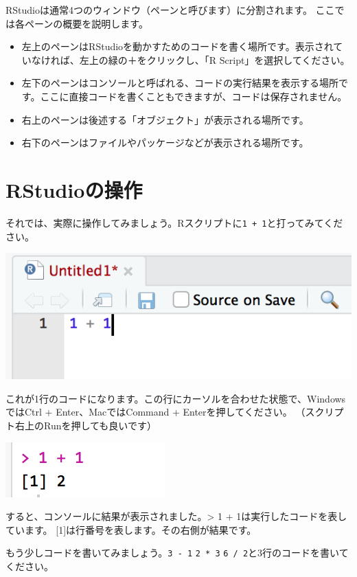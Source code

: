 \documentclass[
]{book}
\providecommand{\tightlist}{%
  \setlength{\itemsep}{0pt}\setlength{\parskip}{0pt}}
\begin{document}
RStudioは通常4つのウィンドウ（ペーンと呼びます）に分割されます。
ここでは各ペーンの概要を説明します。

\begin{itemize}
\tightlist
\item
  左上のペーンはRStudioを動かすためのコードを書く場所です。表示されていなければ、左上の緑の＋をクリックし、「R Script」を選択してください。
\item
  左下のペーンはコンソールと呼ばれる、コードの実行結果を表示する場所です。ここに直接コードを書くこともできますが、コードは保存されません。
\item
  右上のペーンは後述する「オブジェクト」が表示される場所です。
\item
  右下のペーンはファイルやパッケージなどが表示される場所です。
\end{itemize}

\hypertarget{rstudioux306eux64cdux4f5c}{%
\section{RStudioの操作}\label{rstudioux306eux64cdux4f5c}}

それでは、実際に操作してみましょう。Rスクリプトに\texttt{1\ +\ 1}と打ってみてください。

\begin{center}\includegraphics[width=0.4\linewidth]{image/basic1} \end{center}

これが1行のコードになります。この行にカーソルを合わせた状態で、WindowsではCtrl + Enter、MacではCommand + Enterを押してください。
（スクリプト右上のRunを押しても良いです）

\begin{center}\includegraphics[width=0.2\linewidth]{image/basic2} \end{center}

すると、コンソールに結果が表示されました。\textgreater{} 1 + 1は実行したコードを表しています。
{[}1{]}は行番号を表します。その右側が結果です。

もう少しコードを書いてみましょう。\texttt{3\ -\ 1} \texttt{2\ *\ 3} \texttt{6\ /\ 2}と3行のコードを書いてください。
\end{document}
